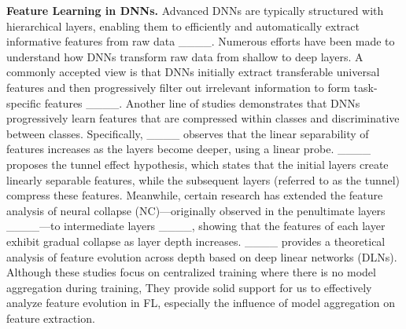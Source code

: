 \textbf{Feature Learning in DNNs.} Advanced DNNs are typically structured with hierarchical layers, enabling them to efficiently and automatically extract informative features from raw data ____. Numerous efforts have been made to understand how DNNs transform raw data from shallow to deep layers. A commonly accepted view is that DNNs initially extract transferable universal features and then progressively filter out irrelevant information to form task-specific features ____. Another line of studies demonstrates that DNNs progressively learn features that are compressed within classes and discriminative between classes. Specifically, ____ observes that the linear separability of features increases as the layers become deeper, using a linear probe. ____ proposes the tunnel effect hypothesis, which states that the initial layers create linearly separable features, while the subsequent layers (referred to as the tunnel) compress these features. Meanwhile, certain research has extended the feature analysis of neural collapse (NC)—originally observed in the penultimate layers ____—to intermediate layers ____, showing that the features of each layer exhibit gradual collapse as layer depth increases. ____ provides a theoretical analysis of feature evolution across depth based on deep linear networks (DLNs). Although these studies focus on centralized training where there is no model aggregation during training, They provide solid support for us to effectively analyze feature evolution in FL, especially the influence of model aggregation on feature extraction.